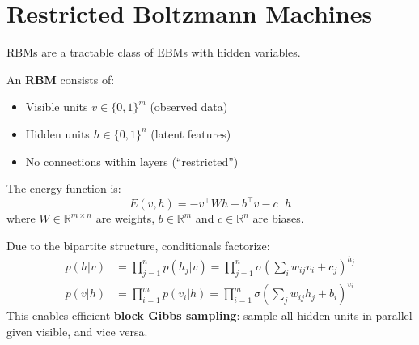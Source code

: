 \section{Restricted Boltzmann Machines}

RBMs are a tractable class of EBMs with hidden variables.

\begin{definition}
    An \textbf{RBM} consists of:
    \begin{itemize}
        \item Visible units $v \in \{0, 1\}^m$ (observed data)
        \item Hidden units $h \in \{0, 1\}^n$ (latent features)
        \item No connections within layers (``restricted'')
    \end{itemize}

    The energy function is:
    \[
        E(v, h) = -v^\top W h - b^\top v - c^\top h
    \]
    where $W \in \mathbb{R}^{m \times n}$ are weights, $b \in \mathbb{R}^m$ and $c \in \mathbb{R}^n$ are biases.
\end{definition}

\begin{theorem}
    Due to the bipartite structure, conditionals factorize:
    \begin{align*}
        p(h | v) &= \prod_{j=1}^{n} p(h_j | v) = \prod_{j=1}^{n} \sigma\left( \sum_i w_{ij} v_i + c_j \right)^{h_j} \\
        p(v | h) &= \prod_{i=1}^{m} p(v_i | h) = \prod_{i=1}^{m} \sigma\left( \sum_j w_{ij} h_j + b_i \right)^{v_i}
    \end{align*}
    This enables efficient \textbf{block Gibbs sampling}: sample all hidden units in parallel given visible, and vice versa.
\end{theorem}

